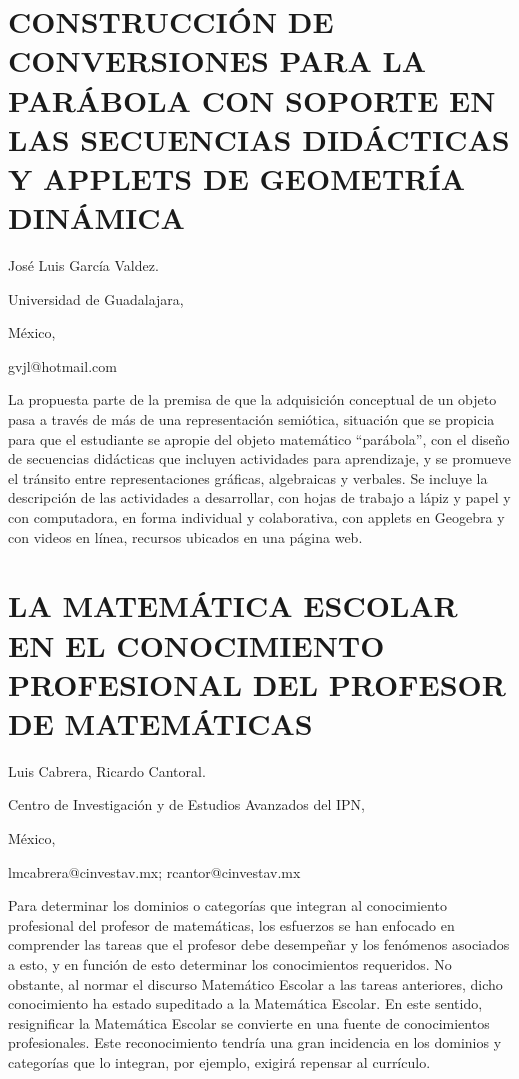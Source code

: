 \section{CONSTRUCCIÓN DE CONVERSIONES PARA LA PARÁBOLA CON SOPORTE EN LAS
SECUENCIAS DIDÁCTICAS Y APPLETS DE GEOMETRÍA DINÁMICA}

\begin{datos}

José Luis García Valdez.

Universidad de Guadalajara,

México,

gvjl@hotmail.com 

\end{datos}

La propuesta parte de la premisa de que la adquisición conceptual
de un objeto pasa a través de más de una representación semiótica,
situación que se propicia para que el estudiante se apropie del objeto
matemático “parábola”, con el diseño de secuencias didácticas que
incluyen actividades para aprendizaje, y se promueve el tránsito entre
representaciones gráficas, algebraicas y verbales. Se incluye la descripción
de las actividades a desarrollar, con hojas de trabajo a lápiz y papel
y con computadora, en forma individual y colaborativa, con applets
en Geogebra y con videos en línea, recursos ubicados en una página
web.


\section{LA MATEMÁTICA ESCOLAR EN EL CONOCIMIENTO PROFESIONAL DEL PROFESOR
DE MATEMÁTICAS}

\begin{datos}

Luis Cabrera, Ricardo Cantoral.

Centro de Investigación y de Estudios Avanzados del IPN,

México,

lmcabrera@cinvestav.mx; rcantor@cinvestav.mx

\end{datos}

Para determinar los dominios o categorías que integran al conocimiento
profesional del profesor de matemáticas, los esfuerzos se han enfocado
en comprender las tareas que el profesor debe desempeñar y los fenómenos
asociados a esto, y en función de esto determinar los conocimientos
requeridos. No obstante, al normar el discurso Matemático Escolar
a las tareas anteriores, dicho conocimiento ha estado supeditado a
la Matemática Escolar. En este sentido, resignificar la Matemática
Escolar se convierte en una fuente de conocimientos profesionales.
Este reconocimiento tendría una gran incidencia en los dominios y
categorías que lo integran, por ejemplo, exigirá repensar al currículo. 


